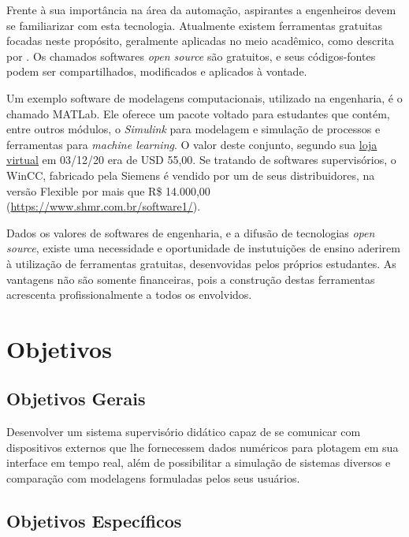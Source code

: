 Frente à sua importância na área da automação, aspirantes a engenheiros devem se familiarizar com esta tecnologia. Atualmente existem ferramentas gratuitas focadas neste propósito, geralmente aplicadas no meio acadêmico, como descrita por . Os chamados softwares \emph{open source} são gratuitos, e seus códigos-fontes podem ser compartilhados, modificados e aplicados à vontade.

Um exemplo software de modelagens computacionais, utilizado na engenharia, é o chamado MATLab\textsuperscript{\tiny \textregistered}. Ele oferece um pacote voltado para estudantes que contém, entre outros módulos, o \emph{Simulink} para modelagem e simulação de processos e ferramentas para \emph{machine learning}. O valor deste conjunto, segundo sua \href{https://www.mathworks.com/store/link/products/student/new}{loja virtual} em 03/12/20 era de USD 55,00. Se tratando de softwares supervisórios, o WinCC, fabricado pela Siemens é vendido por um de seus distribuidores, na versão Flexible por mais que R\$ 14.000,00 (\href{https://www.shmr.com.br/software1/}{https://www.shmr.com.br/software1/}).
	
Dados os valores de softwares de engenharia, e a difusão de tecnologias \emph{open source}, existe uma necessidade e oportunidade de instutuições de ensino aderirem à utilização de ferramentas gratuitas, desenvovidas pelos próprios estudantes. As vantagens não são somente financeiras, pois a construção destas ferramentas acrescenta profissionalmente a todos os envolvidos.

\section{Objetivos}

\subsection{Objetivos Gerais}

Desenvolver um sistema supervisório didático capaz de se comunicar com dispositivos externos que lhe fornecessem dados numéricos para plotagem em sua interface em tempo real, além de possibilitar a simulação de sistemas diversos e comparação com modelagens formuladas pelos seus usuários.

\subsection{Objetivos Específicos}


